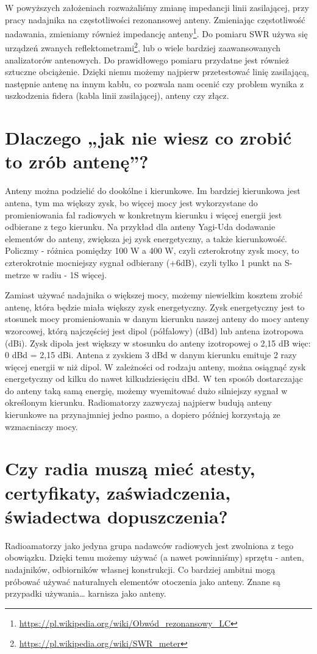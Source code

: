 \documentclass[a4paper,12pt]{article}
\begin{document}
W powyższych założeniach rozważaliśmy zmianę impedancji linii zasilającej, przy pracy nadajnika na częstotliwości rezonansowej anteny. Zmieniając częstotliwość nadawania, zmieniamy również impedancję anteny\footnote{\url{https://pl.wikipedia.org/wiki/Obwód_rezonansowy_LC}}.
Do pomiaru SWR używa się urządzeń zwanych reflektometrami\footnote{\url{https://pl.wikipedia.org/wiki/SWR_meter}}, lub o wiele bardziej zaawansowanych analizatorów antenowych.
Do prawidłowego pomiaru przydatne jest również sztuczne obciążenie. Dzięki niemu możemy najpierw przetestować linię zasilającą, następnie antenę na innym kablu, co pozwala nam ocenić czy problem wynika z uszkodzenia fidera (kabla linii zasilającej), anteny czy złącz.

\section{Dlaczego „jak nie wiesz co zrobić to zrób antenę”?}
Anteny można podzielić do dookólne i kierunkowe. Im bardziej kierunkowa jest antena, tym ma większy zysk, bo więcej mocy jest wykorzystane do promieniowania fal radiowych w konkretnym kierunku i więcej energii jest odbierane z tego kierunku. Na przykład dla anteny Yagi-Uda dodawanie elementów do anteny, zwiększa jej zysk energetyczny, a także kierunkowość.
Policzmy - różnica pomiędzy 100 W a 400 W, czyli czterokrotny zysk mocy, to czterokrotnie mocniejszy sygnał odbierany (+6dB), czyli tylko 1 punkt na S-metrze w radiu - 1S więcej.

Zamiast używać nadajnika o większej mocy, możemy niewielkim kosztem zrobić antenę, która będzie miała większy zysk energetyczny. Zysk energetyczny jest to stosunek mocy promieniowania w danym kierunku naszej anteny do mocy anteny wzorcowej, którą najczęściej jest dipol (półfalowy) (dBd) lub antena izotropowa (dBi). Zysk dipola jest większy w stosunku do anteny izotropowej o 2,15 dB więc: 0 dBd = 2,15 dBi. Antena z zyskiem 3 dBd w danym kierunku emituje 2 razy więcej energii w niż dipol. W zależności od rodzaju anteny, można osiągnąć zysk energetyczny od kilku do nawet kilkudziesięciu dBd. W ten sposób dostarczając do anteny taką samą energię, możemy wyemitować dużo silniejszy sygnał w określonym kierunku. Radiomatorzy zazwyczaj najpierw budują anteny kierunkowe na przynajmniej jedno pasmo, a dopiero później korzystają ze wzmacniaczy mocy.

\section{Czy radia muszą mieć atesty, certyfikaty, zaświadczenia, świadectwa dopuszczenia?}
Radioamatorzy jako jedyna grupa nadawców radiowych jest zwolniona z tego obowiązku. Dzięki temu możemy używać (a nawet powinniśmy) sprzętu - anten, nadajników, odbiorników własnej konstrukcji. Co bardziej ambitni mogą próbować używać naturalnych elementów otoczenia jako anteny. Znane są przypadki używania… karnisza jako anteny.
\end{document}
